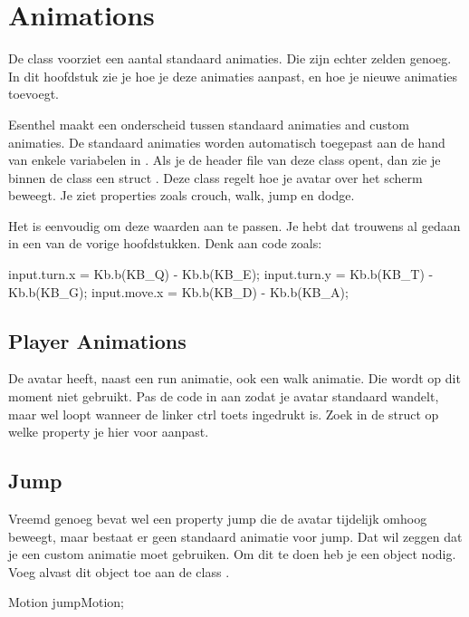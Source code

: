 \chapter{Animations}
De class  voorziet een aantal standaard animaties. Die zijn echter zelden genoeg. In dit hoofdstuk zie je hoe je deze animaties aanpast, en hoe je nieuwe animaties toevoegt.

Esenthel maakt een onderscheid tussen standaard animaties and custom animaties. De standaard animaties worden automatisch toegepast aan de hand van enkele variabelen in . Als je de header file van deze class opent, dan zie je binnen de class een struct . Deze class regelt hoe je avatar over het scherm beweegt. Je ziet properties zoals crouch, walk, jump en dodge.

Het is eenvoudig om deze waarden aan te passen. Je hebt dat trouwens al gedaan in een van de vorige hoofdstukken. Denk aan code zoals:

\begin{code}
input.turn.x = Kb.b(KB_Q) - Kb.b(KB_E);
input.turn.y = Kb.b(KB_T) - Kb.b(KB_G);
input.move.x = Kb.b(KB_D) - Kb.b(KB_A);
\end{code}

\section{Player Animations}

\begin{exercise}
De avatar heeft, naast een run animatie, ook een walk animatie. Die wordt op dit moment niet gebruikt. Pas de code in  aan zodat je avatar standaard wandelt, maar wel loopt wanneer de linker ctrl toets ingedrukt is. Zoek in de struct  op welke property je hier voor aanpast.
\end{exercise}

\section{Jump}
Vreemd genoeg bevat  wel een property jump die de avatar tijdelijk omhoog beweegt, maar bestaat er geen standaard animatie voor jump. Dat wil zeggen dat je een custom animatie moet gebruiken. Om dit te doen heb je een  object nodig. Voeg alvast dit object toe aan de class .

\begin{code}
Motion jumpMotion;
\end{code}

